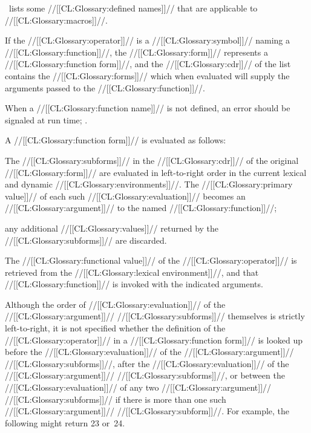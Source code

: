 \Thenextfigure\ lists some //[[CL:Glossary:defined names]]// that are applicable
to //[[CL:Glossary:macros]]//.



\endsubsubsubsubsection%


If the //[[CL:Glossary:operator]]// is a //[[CL:Glossary:symbol]]// naming a //[[CL:Glossary:function]]//,
the //[[CL:Glossary:form]]// represents a //[[CL:Glossary:function form]]//,
and the //[[CL:Glossary:cdr]]// of the list contains the //[[CL:Glossary:forms]]// 
which when evaluated will supply the arguments passed to the //[[CL:Glossary:function]]//.

When a //[[CL:Glossary:function name]]// is not defined, 
an error  should be signaled at run time;
\seesection\SemanticConstraints.

A //[[CL:Glossary:function form]]// is evaluated as follows:

The //[[CL:Glossary:subforms]]// in the //[[CL:Glossary:cdr]]// of the original //[[CL:Glossary:form]]//
are evaluated in left-to-right order in the current lexical and 
dynamic //[[CL:Glossary:environments]]//.  The //[[CL:Glossary:primary value]]// of each
such //[[CL:Glossary:evaluation]]// becomes an //[[CL:Glossary:argument]]// to the named //[[CL:Glossary:function]]//;

any additional //[[CL:Glossary:values]]// returned by the //[[CL:Glossary:subforms]]// are discarded.

The //[[CL:Glossary:functional value]]// of the //[[CL:Glossary:operator]]// 
is retrieved from the //[[CL:Glossary:lexical environment]]//,
and that //[[CL:Glossary:function]]// is invoked with the indicated arguments.











Although the order of //[[CL:Glossary:evaluation]]// of 
the //[[CL:Glossary:argument]]// //[[CL:Glossary:subforms]]// themselves is 
strictly left-to-right, it is not specified whether 
the definition of the //[[CL:Glossary:operator]]// in a //[[CL:Glossary:function form]]// is looked up 
before the //[[CL:Glossary:evaluation]]// of the //[[CL:Glossary:argument]]// //[[CL:Glossary:subforms]]//,
after the //[[CL:Glossary:evaluation]]// of the //[[CL:Glossary:argument]]// //[[CL:Glossary:subforms]]//,
or between the //[[CL:Glossary:evaluation]]// of any two //[[CL:Glossary:argument]]// //[[CL:Glossary:subforms]]// 
if there is more than one such //[[CL:Glossary:argument]]// //[[CL:Glossary:subform]]//.  
For example, the following might return 23 or~24.

